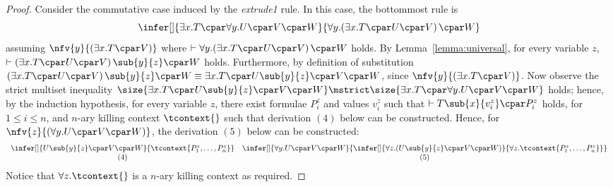 \documentclass[UKenglish,acmsmall,authorversion]{acmart}
\theoremstyle{plain}
\begin{document}
\begin{proof}
Consider the commutative case induced by the \textit{extrude1} rule. In this case, the bottommost rule is
\[
\infer[]{
\exists x. T \cpar \forall y. U \cpar V \cpar W
}{
\mathopen{\forall y.}\left( \exists x. T \cpar U \cpar V \right) \cpar W
}
\]
 assuming $\nfv{y}{(\exists x. T \cpar V)}$
where $\vdash \mathopen{\forall y.}\left( \exists x. T \cpar U \cpar V \right) \cpar W$ holds.
By Lemma~\ref{lemma:universal}, for every variable $z$, $\vdash \left( \exists x. T \cpar U \cpar V \right)\sub{y}{z} \cpar W$ holds.
Furthermore, by definition of substitution $\left( \exists x. T \cpar U \cpar V \right)\sub{y}{z} \cpar W \equiv \exists x. T \cpar U\sub{y}{z} \cpar V \cpar W$,  since $\nfv{y}{(\exists x. T \cpar V)}$.
%
Now observe the strict multiset inequality $
\size{ \exists x. T \cpar U\sub{y}{z} \cpar V \cpar W } \mstrict \size{ \exists x. T \cpar \forall y. U \cpar V \cpar W }
$ holds;
hence, by the induction hypothesis, for every variable $z$, there exist formulae $P^z_i$ and values $v^z_i$ such that $\vdash T\sub{x}{v^z_i} \cpar P^z_i$ holds, for $1 \leq i \leq n$, and $n$-ary killing context $\tcontext{}$ such that derivation $(4)$ below can be constructed. Hence, for $\nfv{z}{(\forall y. U \cpar V \cpar W)}$, the  derivation $(5)$
below can be constructed:
\[
\begin{array}{cc}
\infer[]{
U\sub{y}{z} \cpar V \cpar W
}{
\tcontext{P^z_1, \hdots, P^z_n}
}
&
\infer[]{
\forall y. U \cpar V \cpar W
}{
\infer[]{
\mathopen{\forall z.} \left( U\sub{y}{z} \cpar V \cpar W \right) 
}{
\mathopen{\forall z.} \tcontext{P^z_1, \hdots, P^z_n} 
}} \\
(4) & (5) 
\end{array}
\]
Notice that $\mathopen{\forall z.} \tcontext{}$ is a $n$-ary killing context as required.


\end{proof}
\end{document}
